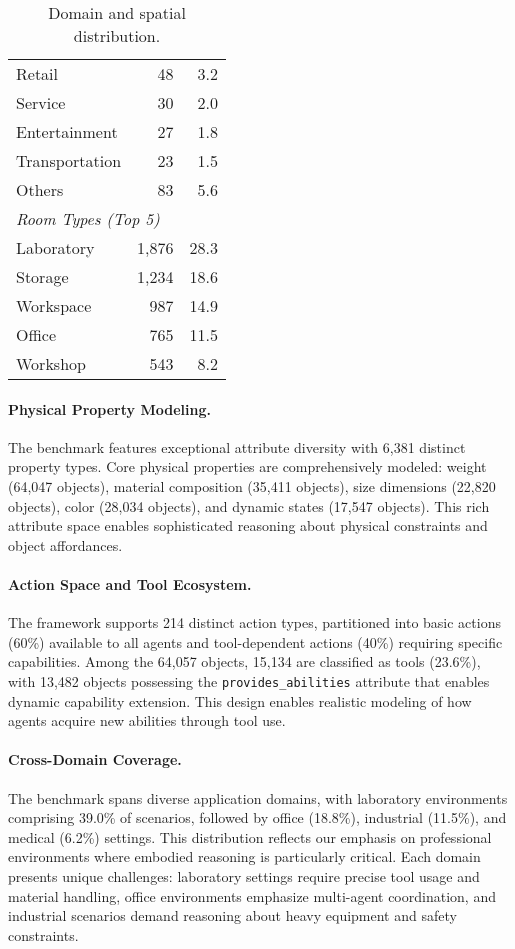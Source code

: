 \begin{table}[htbp]
\begin{minipage}[t]{0.47\textwidth}
\begin{tabular}{lrr}
Retail & 48 & 3.2 \\
Service & 30 & 2.0 \\
Entertainment & 27 & 1.8 \\
Transportation & 23 & 1.5 \\
Others & 83 & 5.6 \\
\midrule
\multicolumn{3}{l}{\textit{Room Types (Top 5)}} \\
Laboratory & 1,876 & 28.3 \\
Storage & 1,234 & 18.6 \\
Workspace & 987 & 14.9 \\
Office & 765 & 11.5 \\
Workshop & 543 & 8.2 \\
\bottomrule
\end{tabular}
\caption{Domain and spatial distribution.}
\label{tab:domain_distribution}
\end{minipage}
\end{table}

\paragraph{Physical Property Modeling.}
The benchmark features exceptional attribute diversity with 6,381 distinct property types. Core physical properties are comprehensively modeled: weight (64,047 objects), material composition (35,411 objects), size dimensions (22,820 objects), color (28,034 objects), and dynamic states (17,547 objects). This rich attribute space enables sophisticated reasoning about physical constraints and object affordances.

\paragraph{Action Space and Tool Ecosystem.}
The framework supports 214 distinct action types, partitioned into basic actions (60\%) available to all agents and tool-dependent actions (40\%) requiring specific capabilities. Among the 64,057 objects, 15,134 are classified as tools (23.6\%), with 13,482 objects possessing the \texttt{provides\_abilities} attribute that enables dynamic capability extension. This design enables realistic modeling of how agents acquire new abilities through tool use.

\paragraph{Cross-Domain Coverage.}
The benchmark spans diverse application domains, with laboratory environments comprising 39.0\% of scenarios, followed by office (18.8\%), industrial (11.5\%), and medical (6.2\%) settings. This distribution reflects our emphasis on professional environments where embodied reasoning is particularly critical. Each domain presents unique challenges: laboratory settings require precise tool usage and material handling, office environments emphasize multi-agent coordination, and industrial scenarios demand reasoning about heavy equipment and safety constraints.

